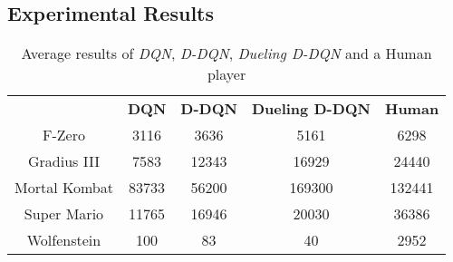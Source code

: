 \documentclass{article}
\begin{document}
\begin{appendices}

\chapter{Experimental Results}

\renewcommand{\arraystretch}{1.5}
\begin{table}[ht]
\centering
\caption{Average results of \textit{DQN}, \textit{D-DQN}, \textit{Dueling D-DQN} and a Human player} 
\label{table:Experiments_Results}
\begin{tabular}{| c | c | c | c | c | }

\cline{1-5}
 & \textbf{DQN} &\textbf{D-DQN} &\textbf{Dueling D-DQN}  &\textbf{Human}    \\ \cline{1-5}
F-Zero	&3116	&3636	&5161	&6298	\\ \cline{1-5}
Gradius III	&7583	&12343	&16929		&24440	\\ \cline{1-5}
Mortal Kombat	&83733	&56200	&169300		&132441	\\ \cline{1-5}
Super Mario	&11765	&16946	&20030		&36386	\\ \cline{1-5}
Wolfenstein	&100	&83	&40		&2952	\\ \cline{1-5}


\end{tabular}
\end{table}

\end{appendices}
\end{document}

